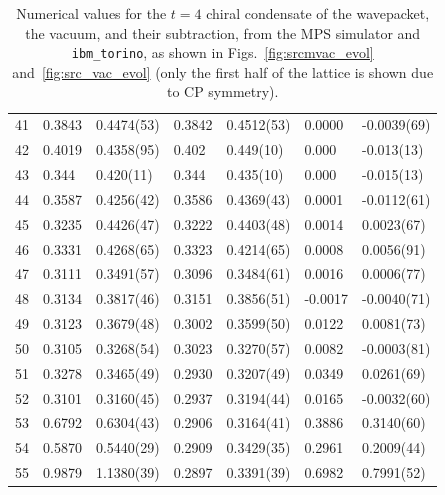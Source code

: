 \documentclass[aps, prc, tightenlines,superscriptaddress, letterpaper, amsmath, amssymb, preprintnumbers, floatfix, longbibliography, nofootinbib]{revtex4-2}
\begin{document}
\begin{table}[!htb]
{\begin{tabularx}{\textwidth}{| c || Y | Y | Y | Y | Y | Y |}
41	&	0.3843	&	0.4474(53)	&	0.3842	&	0.4512(53)	&	0.0000	&	-0.0039(69)	\\
42	&	0.4019	&	0.4358(95)	&	0.402	&	0.449(10)	&	0.000	&	-0.013(13)	\\
43	&	0.344	&	0.420(11)	&	0.344	&	0.435(10)	&	0.000	&	-0.015(13)	\\
44	&	0.3587	&	0.4256(42)	&	0.3586	&	0.4369(43)	&	0.0001	&	-0.0112(61)	\\
45	&	0.3235	&	0.4426(47)	&	0.3222	&	0.4403(48)	&	0.0014	&	0.0023(67)	\\
46	&	0.3331	&	0.4268(65)	&	0.3323	&	0.4214(65)	&	0.0008	&	0.0056(91)	\\
47	&	0.3111	&	0.3491(57)	&	0.3096	&	0.3484(61)	&	0.0016	&	0.0006(77)	\\
48	&	0.3134	&	0.3817(46)	&	0.3151	&	0.3856(51)	&	-0.0017	&	-0.0040(71)	\\
49	&	0.3123	&	0.3679(48)	&	0.3002	&	0.3599(50)	&	0.0122	&	0.0081(73)	\\
50	&	0.3105	&	0.3268(54)	&	0.3023	&	0.3270(57)	&	0.0082	&	-0.0003(81)	\\
51	&	0.3278	&	0.3465(49)	&	0.2930	&	0.3207(49)	&	0.0349	&	0.0261(69)	\\
52	&	0.3101	&	0.3160(45)	&	0.2937	&	0.3194(44)	&	0.0165	&	-0.0032(60)	\\
53	&	0.6792	&	0.6304(43)	&	0.2906	&	0.3164(41)	&	0.3886	&	0.3140(60)	\\
54	&	0.5870	&	0.5440(29)	&	0.2909	&	0.3429(35)	&	0.2961	&	0.2009(44)	\\
55	&	0.9879	&	1.1380(39)	&	0.2897	&	0.3391(39)	&	0.6982	&	0.7991(52)	\\ \hline
\end{tabularx}}
\caption{Numerical values for the $t=4$ chiral condensate of the wavepacket, the vacuum, and their subtraction, from the MPS simulator and {\tt ibm\_torino}, as shown in Figs.~\ref{fig:srcmvac_evol} and~\ref{fig:src_vac_evol} (only the first half of the lattice is shown due to CP symmetry).}
 \label{tab:tablet4}
\end{table}
%
\end{document}
